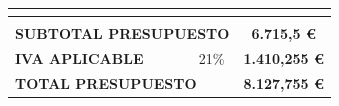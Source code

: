 \begin{table}[ht]
{{\begin{tabular}{|p{1.5cm}|p{1.5cm}|p{1.5cm}|p{1.5cm}|p{1.5cm}|p{1.5cm}|p{1.5cm}|p{1.5cm}|p{1.5cm}}
\multicolumn{2}{l}{} & \multicolumn{2}{l}{} & \multicolumn{2}{l}{} & \multicolumn{2}{l}{} &  \\ \hline
\multicolumn{2}{l}{} & \multicolumn{2}{l}{} & \multicolumn{2}{l}{} & \multicolumn{2}{l}{} &  \\ \hline
\multicolumn{8}{|l|}{\textbf{SUBTOTAL PRESUPUESTO}} & \multicolumn{1}{c|}{\textbf{6.715,5 €}} \\ \hline
\multicolumn{7}{|l|}{\textbf{IVA APLICABLE}} & \multicolumn{1}{c|}{21\%} & \multicolumn{1}{c|}{\textbf{1.410,255 €}} \\ \hline
\multicolumn{8}{|l|}{\textbf{TOTAL PRESUPUESTO}} & \multicolumn{1}{c|}{\textbf{8.127,755 €}} \\ \hline
\end{tabular}}}
\label{tab:presupuesto2}
\end{table}

